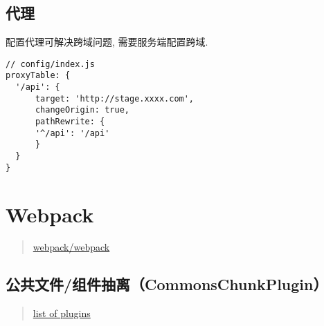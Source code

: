 \subsection{代理}\label{ux4ee3ux7406}

配置代理可解决跨域问题, 需要服务端配置跨域.

\begin{lstlisting}
// config/index.js
proxyTable: {
  '/api': {
      target: 'http://stage.xxxx.com',
      changeOrigin: true,
      pathRewrite: {
      '^/api': '/api'
      }
  }
}
\end{lstlisting}

\section{Webpack}\label{webpack}

\begin{quote}
\href{https://github.com/webpack/webpack}{webpack/webpack}
\end{quote}

\subsection{公共文件/组件抽离（CommonsChunkPlugin）}\label{ux516cux5171ux6587ux4ef6ux7ec4ux4ef6ux62bdux79bbcommonschunkplugin}

\begin{quote}
\href{https://github.com/webpack/docs/wiki/list-of-plugins\#commonschunkplugin}{list
of plugins}
\end{quote}
